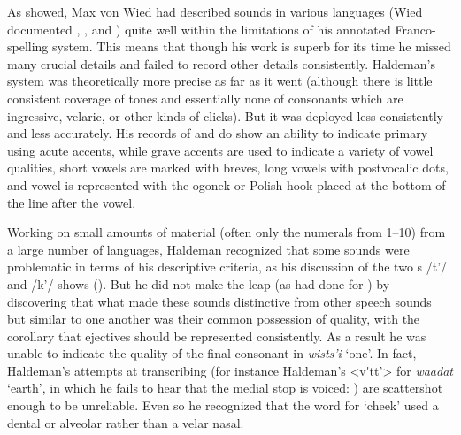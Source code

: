 \documentclass[output=paper]{LSP/langsci}
\begin{document}
As \citet{Rankin1994} showed, Max von Wied \citep{Maximilian18391841} had described sounds in various  languages (Wied documented , ,  and ) quite well within the limitations of his annotated Franco- spelling system. This means that though his work is superb for its time he missed many crucial details and failed to record other details consistently.   Haldeman's system was theoretically more precise as far as it went (although there is little consistent coverage of tones and essentially none of consonants which are ingressive, velaric, or other kinds of clicks). But it was deployed less consistently and less accurately.   His records of  and  do show an ability to indicate primary  using acute accents, while grave accents are used to indicate a variety of vowel qualities, short vowels are marked with breves, long vowels with postvocalic dots, and vowel  is represented with the ogonek or Polish hook placed at the bottom of the line after the vowel.  

Working on small amounts of material (often only the numerals from 1--10) from a large number of languages, Haldeman recognized that some sounds were problematic in terms of his descriptive criteria, as his discussion of the two s   /t'/ and  /k'/ shows (\citealt[99: \S448; 131: \S574]{Haldeman1860}).  But he did not make the leap (as \citealt{Garcia1760} had done for ) by discovering that what made these sounds distinctive from other speech sounds but similar to one another was their common possession of  quality, with the corollary that ejectives should be represented consistently.  As a result he was unable to indicate the  quality of the final consonant in  \textit{wists'i} `one'.  In fact, Haldeman's attempts at transcribing  (for instance Haldeman's <v\'{}tt'> for \textit{waadat} `earth', in which he fails to hear that the medial stop is voiced: \citealt[135, \S633]{Haldeman1860}) are scattershot enough to be unreliable. Even so he recognized that the  word for `cheek'  used a dental or alveolar rather than a velar nasal.    
\end{document}
